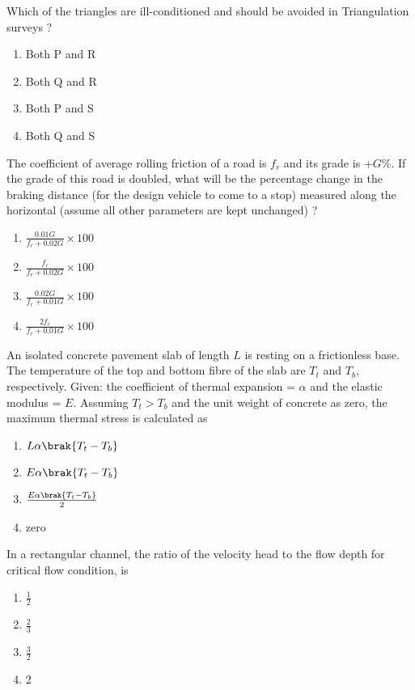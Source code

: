Which of the triangles are ill-conditioned and should be avoided in Triangulation surveys ?
\begin{enumerate}
   \item Both P and R 
   \item Both Q and R 
   \item Both P and S
   \item Both Q and S \\
\end{enumerate}
\item The coefficient of average rolling friction of a road is $f_r$ and its grade is +$G$\%. If the grade of this road is doubled, what will be the percentage change in the braking distance (for the design vehicle to come to a stop) measured along the horizontal (assume all other parameters are kept unchanged) ?
\begin{enumerate}
    \item $\frac{0.01 G}{f_r + 0.02 G} \times 100$
    \item $\frac{f_r}{f_r + 0.02 G} \times 100$
    \item $\frac{0.02 G}{f_r + 0.01 G} \times 100$
    \item $\frac{2 f_r}{f_r + 0.01 G} \times 100$ \\
\end{enumerate}
\item An isolated concrete pavement slab of length $L$ is resting on a frictionless base. The temperature of the top and bottom fibre of the slab are $T_t$ and $T_b$, respectively. Given: the coefficient of thermal expansion = $\alpha$ and the elastic modulus = $E$. Assuming $T_t > T_b$ and the unit weight of concrete as zero, the maximum thermal stress is calculated as
\begin{enumerate}
    \item $L \alpha \brak{T_t - T_b}$
    \item $E \alpha \brak{T_t - T_b}$
    \item $\frac{E \alpha \brak{T_t - T_b}}{2}$
    \item zero \\
\end{enumerate}
\item In a rectangular channel, the ratio of the velocity head to the flow depth for critical flow condition, is
\begin{enumerate}
    \item $\frac{1}{2}$
    \item $\frac{2}{3}$
    \item $\frac{3}{2}$
    \item 2 \\
\end{enumerate}
